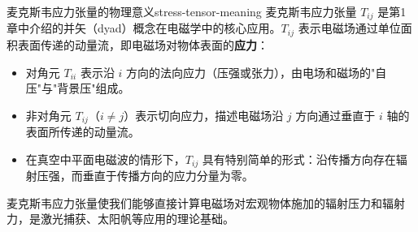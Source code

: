 \documentclass[11pt,a4paper,openany,oneside]{book}
\begin{document}
\begin{insight}{麦克斯韦应力张量的物理意义}{stress-tensor-meaning}
麦克斯韦应力张量 $T_{ij}$ 是第1章中介绍的并矢（dyad）概念在电磁学中的核心应用。$T_{ij}$ 表示电磁场通过单位面积表面传递的动量流，即电磁场对物体表面的\textbf{应力}：
\begin{itemize}
\item 对角元 $T_{ii}$ 表示沿 $i$ 方向的法向应力（压强或张力），由电场和磁场的"自压"与"背景压"组成。
\item 非对角元 $T_{ij}$（$i\neq j$）表示切向应力，描述电磁场沿 $j$ 方向通过垂直于 $i$ 轴的表面所传递的动量流。
\item 在真空中平面电磁波的情形下，$T_{ij}$ 具有特别简单的形式：沿传播方向存在辐射压强，而垂直于传播方向的应力分量为零。
\end{itemize}
麦克斯韦应力张量使我们能够直接计算电磁场对宏观物体施加的辐射压力和辐射力，是激光捕获、太阳帆等应用的理论基础。
\end{insight}
\end{document}
